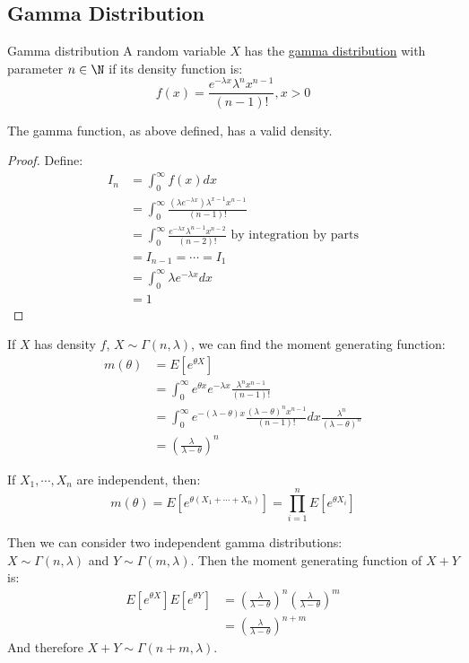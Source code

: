 \documentclass[../Main.tex]{subfiles}
\begin{document}
\subsection{Gamma Distribution}
\begin{definition}{Gamma distribution}
    A random variable $X$ has the \underline{gamma distribution} with parameter $n \in \N$ if its density function is:
    \begin{equation*}
        f(x) = \frac{e^{-\lambda x} \lambda^n x^{n-1}}{(n-1)!}, x > 0
    \end{equation*}
\end{definition}
\begin{proposition}
    The gamma function, as above defined, has a valid density.
    \label{propGammaDensityValid}
\end{proposition}
\begin{proof}
    Define:
    \begin{align*}
        I_n &= \int_0^\infty f(x) dx \\
        &= \int_0^\infty \frac{\left(\lambda e^{-\lambda x}\right)\lambda^{x-1} x^{n-1}}{(n-1)!} \\
        &= \int_0^\infty \frac{e^{-\lambda x}\lambda^{n-1} x^{n-2}}{(n-2)!} \text{ by integration by parts} \\
        &= I_{n-1} = \cdots = I_1 \\
        &= \int_0^\infty \lambda e^{-\lambda x} dx \\
        &= 1
    \end{align*}
\end{proof}
If $X$ has density $f$, $X \sim \Gamma(n, \lambda)$, we can find the moment generating function:
\begin{align*}
    m(\theta) &= E[e^{\theta X}] \\
    &= \int_0^\infty e^{\theta x} e^{-\lambda x} \frac{\lambda^n x^{n-1}}{(n-1)!} \\
    &= \int_0^\infty e^{-(\lambda - \theta)x} \frac{(\lambda - \theta)^n x^{n-1}}{(n-1)!} dx \frac{\lambda^n}{(\lambda - \theta)^n} \\
    &= \left(\frac{\lambda}{\lambda - \theta}\right)^n
\end{align*}
\begin{proposition}
    If $X_1, \cdots, X_n$ are independent, then:
    \begin{equation*}
        m(\theta) = E[e^{\theta (X_1 + \cdots + X_n)}] = \prod_{i=1}^n E[e^{\theta X_i}]
    \end{equation*}
    \label{propMGFFactorise}
\end{proposition}
Then we can consider two independent gamma distributions: \\$X \sim \Gamma(n, \lambda)$ and $Y \sim \Gamma(m, \lambda)$. Then the moment generating function of $X+Y$ is:
\begin{align*}
    E[e^{\theta X}] E[e^{\theta Y}] &= \left(\frac{\lambda}{\lambda - \theta}\right)^n \left(\frac{\lambda}{\lambda - \theta}\right)^m \\
    &= \left(\frac{\lambda}{\lambda - \theta}\right)^{n+m}
\end{align*}
And therefore $X + Y \sim \Gamma(n+m, \lambda)$.
\end{document}
